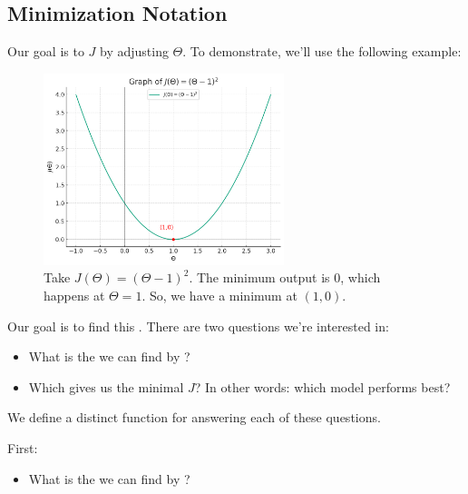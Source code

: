         
        
        
        
        
    \subsection{Minimization Notation}
        
        Our goal is to  $J$ by adjusting $\Theta$. To demonstrate, we'll use the following example:

        \begin{figure}[H]
            \centering
            \includegraphics[width=70mm,scale=0.5]{images/regression_images/minimizing_(x-q)^2.png}
        
            \caption*{Take $J(\Theta)=(\Theta-1)^2$. The minimum output is 0, which happens at $\Theta=1$. So, we have a minimum at $(1, 0)$.}
        \end{figure}

        Our goal is to find this . There are two questions we're interested in:

        \begin{itemize}
            \item What is the  we can find by ?
            \item Which  gives us the minimal $J$? In other words: which model performs best?
        \end{itemize}

        We define a distinct function for answering each of these questions. 
        
        \phantom{}
        
        First:
        
        \begin{itemize}
            \item What is the  we can find by ?\\
        \end{itemize}
        
